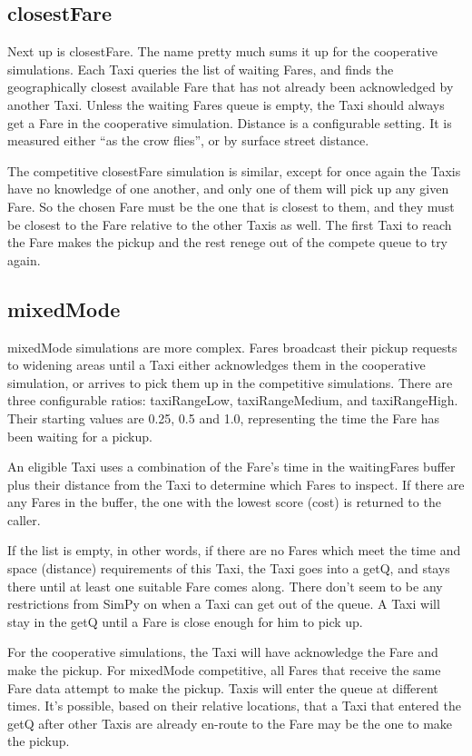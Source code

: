 \documentclass[11pt,letterpaper,onecolumn,twoside,openright,draft]{report}
\begin{document}
\subsection{closestFare}
Next up is closestFare.
The name pretty much sums it up for the cooperative simulations.
Each Taxi queries the list of waiting Fares, and finds the geographically closest available Fare that has not already been acknowledged by another Taxi.
Unless the waiting Fares queue is empty, the Taxi should always get a Fare in the cooperative simulation.
Distance is a configurable setting.
It is measured either ``as the crow flies'', or by surface street distance.

The competitive closestFare simulation is similar, except for once again the Taxis have no knowledge of one another, and only one of them will pick up any given Fare.
So the chosen Fare must be the one that is closest to them, and they must be closest to the Fare relative to the other Taxis as well.
The first Taxi to reach the Fare makes the pickup and the rest renege out of the compete queue to try again.

\subsection{mixedMode}
mixedMode simulations are more complex.
Fares broadcast their pickup requests to widening areas until a Taxi either acknowledges them in the cooperative simulation, or arrives to pick them up in the competitive simulations.
There are three configurable ratios: taxiRangeLow, taxiRangeMedium, and taxiRangeHigh.
Their starting values are 0.25, 0.5 and 1.0, representing the time the Fare has been waiting for a pickup.

An eligible Taxi uses a combination of the Fare's time in the waitingFares buffer plus their distance from the Taxi to determine which Fares to inspect.
If there are any Fares in the buffer, the one with the lowest score (cost) is returned to the caller.

If the list is empty, in other words, if there are no Fares which meet the time and space (distance) requirements of this Taxi, the Taxi goes into a getQ, and stays there until at least one suitable Fare comes along.
There don't seem to be any restrictions from SimPy on when a Taxi can get out of the queue.
A Taxi will stay in the getQ until a Fare is close enough for him to pick up.

For the cooperative simulations, the Taxi will have acknowledge the Fare and make the pickup.
For mixedMode competitive, all Fares that receive the same Fare data attempt to make the pickup.
Taxis will enter the queue at different times.
It's possible, based on their relative locations, that a Taxi that entered the getQ after other Taxis are already en-route to the Fare may be the one to make the pickup.
\end{document}
